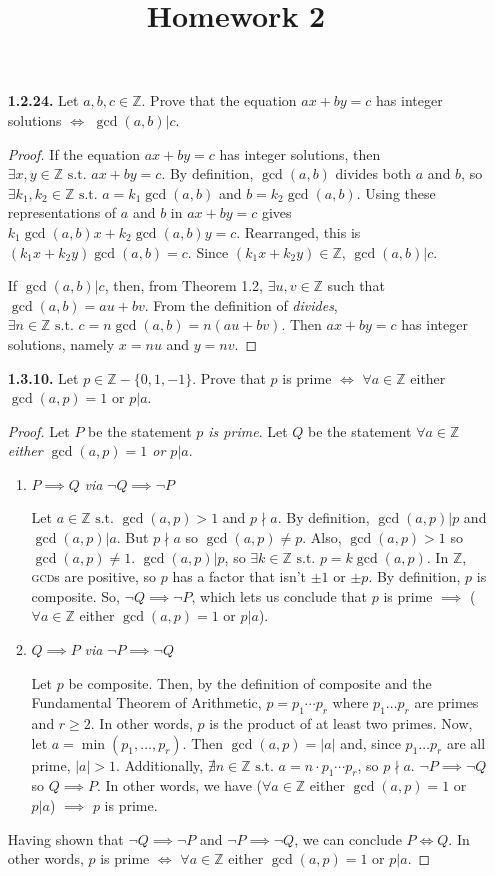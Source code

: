 \documentclass[12pt]{article}
\title{Homework 2}
\newcommand{\zee}{\mathbb{Z}}
\newcommand{\such}{\text{ s.t. }}
\newcommand{\abs}[1]{{\lvert}#1{\rvert}}
\begin{document}
\begin{itemize}
\item[\textbf{1.2.24.}] Let $a,b,c\in\zee$. Prove that the equation $ax+by=c$ has integer solutions $\iff$ $\gcd(a,b)|c$.

\begin{proof}
  If the equation $ax+by=c$ has integer solutions, then $\exists x, y \in \zee \such ax+by=c$.
  By definition, $\gcd(a, b)$ divides both $a$ and $b$, so $\exists k_1, k_2 \in \zee \such a=k_1 \gcd(a,b)$ and $b=k_2 \gcd(a,b)$.
  Using these representations of $a$ and $b$ in $ax+by=c$ gives $k_1 \gcd(a,b) x + k_2 \gcd(a,b) y = c$.
  Rearranged, this is $(k_1 x + k_2 y) \gcd(a,b) = c$.
  Since $(k_1 x + k_2 y) \in \zee$, $\gcd(a,b)|c$.
  \par
  If $\gcd(a,b)|c$, then, from Theorem 1.2, $\exists u,v \in \zee$ such that $\gcd(a,b) = a u + b v$.
  From the definition of \textit{divides}, $\exists n \in \zee \such c = n \gcd(a, b) = n (a u + b v)$.
  Then $ax+by=c$ has integer solutions, namely $x = n u$ and $y = n v$.
\end{proof}


\item[\textbf{1.3.10.}] Let $p\in\zee-\{0,1,-1\}$. Prove that $p$ is prime $\iff$ $\forall a\in\zee$ either $\gcd(a,p)=1$ or $p|a$.
\begin{proof}
Let $P$ be the statement \textit{$p$ is prime}. Let $Q$ be the statement \textit{$\forall a\in\zee$ either $\gcd(a,p)=1$ or $p|a$}.
\begin{enumerate}
\item $P \implies Q$ \textit{via} $\neg Q \implies \neg P$
  \par
  Let $a\in\zee\such\gcd(a,p)>1$ and $p \nmid a$.
  By definition, $\gcd(a,p)|p$ and $\gcd(a,p)|a$.
  But $p \nmid a$ so $\gcd(a,p)\neq p$.
  Also, $\gcd(a,p)>1$ so $\gcd(a,p)\neq 1$.
  $\gcd(a,p)|p$, so $\exists k\in\zee\such p=k \gcd(a,p)$.
  In $\zee$, \textsc{gcd}s are positive, so $p$ has a factor that isn't $\pm 1$ or $\pm p$.
  By definition, $p$ is composite.
  So, $\neg Q \implies \neg P$, which lets us conclude that $p$ is prime $\implies$ ($\forall a\in\zee$ either $\gcd(a,p)=1$ or $p|a$).

\item $Q \implies P$ \textit{via} $\neg P \implies \neg Q$
  \par
  Let $p$ be composite.
  Then, by the definition of composite and the Fundamental Theorem of Arithmetic, $p = p_1 \dotsb p_r$ where $p_1 \dotsc p_r$  are primes and $r \geq 2$.
  In other words, $p$ is the product of at least two primes.
  Now, let $a = \min(p_1, \dotsc,  p_r)$.
  Then $\gcd(a,p) = \abs{a}$ and, since $p_1 \dotsc p_r$ are all prime, $\abs{a} > 1$.
  Additionally, $\nexists n \in \zee \such a = n \cdot p_1 \dotsb p_r$, so $p \nmid a$.
  $\neg P \implies \neg Q$ so $Q \implies P$.
  In other words, we have ($\forall a\in\zee$ either $\gcd(a,p)=1$ or $p|a$) $\implies$ $p$ is prime.
\end{enumerate}
Having shown that $\neg Q \implies \neg P$ and $\neg P \implies \neg Q$, we can conclude $P \iff Q$.
In other words, $p$ is prime $\iff$ $\forall a\in\zee$ either $\gcd(a,p)=1$ or $p|a$.
\end{proof}



\end{itemize}
\end{document}
